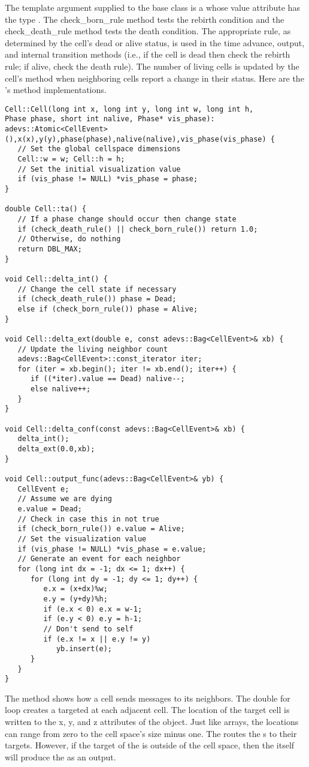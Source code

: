 The template argument supplied to the base  class is a  whose value attribute has the type . The check\_born\_rule method tests the rebirth condition and the check\_death\_rule method tests the death condition. The appropriate rule, as determined by the cell's dead or alive status, is used in the time advance, output, and internal transition methods (i.e., if the cell is dead then check the rebirth rule; if alive, check the death rule). The number of living cells is updated by the cell's  method when neighboring cells report a change in their status. Here are the 's method implementations.
\begin{verbatim}
Cell::Cell(long int x, long int y, long int w, long int h, 
Phase phase, short int nalive, Phase* vis_phase):
adevs::Atomic<CellEvent>(),x(x),y(y),phase(phase),nalive(nalive),vis_phase(vis_phase) {
   // Set the global cellspace dimensions
   Cell::w = w; Cell::h = h;
   // Set the initial visualization value
   if (vis_phase != NULL) *vis_phase = phase;
}

double Cell::ta() {
   // If a phase change should occur then change state 
   if (check_death_rule() || check_born_rule()) return 1.0;
   // Otherwise, do nothing
   return DBL_MAX;
}

void Cell::delta_int() { 
   // Change the cell state if necessary
   if (check_death_rule()) phase = Dead;
   else if (check_born_rule()) phase = Alive;
}

void Cell::delta_ext(double e, const adevs::Bag<CellEvent>& xb) {
   // Update the living neighbor count 
   adevs::Bag<CellEvent>::const_iterator iter;
   for (iter = xb.begin(); iter != xb.end(); iter++) {
      if ((*iter).value == Dead) nalive--;
      else nalive++;
   }
}

void Cell::delta_conf(const adevs::Bag<CellEvent>& xb) { 
   delta_int();
   delta_ext(0.0,xb);
}

void Cell::output_func(adevs::Bag<CellEvent>& yb) { 
   CellEvent e;
   // Assume we are dying
   e.value = Dead;
   // Check in case this in not true
   if (check_born_rule()) e.value = Alive;
   // Set the visualization value
   if (vis_phase != NULL) *vis_phase = e.value;
   // Generate an event for each neighbor
   for (long int dx = -1; dx <= 1; dx++) {
      for (long int dy = -1; dy <= 1; dy++) {
         e.x = (x+dx)%w;
         e.y = (y+dy)%h;
         if (e.x < 0) e.x = w-1;
         if (e.y < 0) e.y = h-1;
         // Don't send to self
         if (e.x != x || e.y != y)
            yb.insert(e);
      }
   }
}
\end{verbatim}
The  method shows how a cell sends messages to its neighbors. The double for loop creates a  targeted at each adjacent cell. The location of the target cell is written to the x, y, and z attributes of the  object. Just like arrays, the locations can range from zero to the cell space's size minus one. The  routes the s to their targets. However, if the target of the  is outside of the cell space, then the  itself will produce the  as an output.


